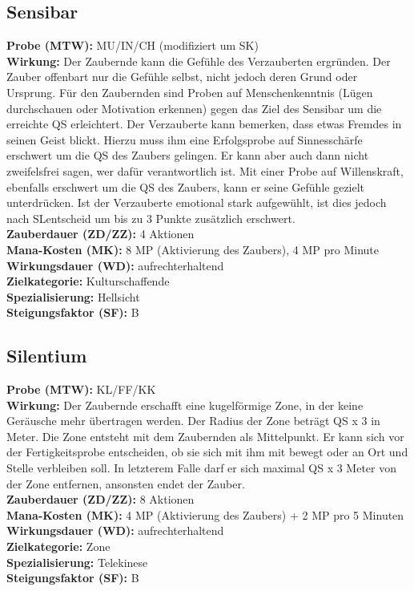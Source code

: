 \subsection{Sensibar}
\label{chap:sensibar}
\textbf{Probe (MTW):} MU/IN/CH (modifiziert um SK) \\
\textbf{Wirkung:} Der Zaubernde kann die Gefühle des Verzauberten ergründen. Der Zauber offenbart nur die Gefühle selbst, nicht jedoch deren Grund oder Ursprung. Für den Zaubernden sind Proben auf Menschenkenntnis (Lügen durchschauen oder Motivation erkennen) gegen das Ziel des Sensibar um die erreichte QS erleichtert. Der Verzauberte kann bemerken, dass etwas Fremdes in seinen Geist blickt. Hierzu muss ihm eine Erfolgsprobe auf Sinnesschärfe erschwert um die QS des Zaubers gelingen. Er kann aber auch dann nicht zweifelsfrei sagen, wer dafür verantwortlich ist. Mit einer Probe auf Willenskraft, ebenfalls erschwert um die QS des Zaubers, kann er seine Gefühle gezielt unterdrücken. Ist der Verzauberte emotional stark aufgewühlt, ist dies jedoch nach SLentscheid um bis zu 3 Punkte zusätzlich erschwert. \\
\textbf{Zauberdauer (ZD/ZZ):} 4 Aktionen \\
\textbf{Mana-Kosten (MK):} 8 MP (Aktivierung des Zaubers), 4 MP pro Minute \\
\textbf{Wirkungsdauer (WD):} aufrechterhaltend \\
\textbf{Zielkategorie:} Kulturschaffende \\
\textbf{Spezialisierung:} Hellsicht \\
\textbf{Steigungsfaktor (SF):} B


\subsection{Silentium}
\label{chap:silentium}
\textbf{Probe (MTW):} KL/FF/KK \\
\textbf{Wirkung:} Der Zaubernde erschafft eine kugelförmige Zone, in der keine Geräusche mehr übertragen werden. Der Radius der Zone beträgt QS x 3 in Meter. Die Zone entsteht mit dem Zaubernden als Mittelpunkt. Er kann sich vor der Fertigkeitsprobe entscheiden, ob sie sich mit ihm mit bewegt oder an Ort und Stelle verbleiben soll. In letzterem Falle darf er sich maximal QS x 3 Meter von der Zone entfernen, ansonsten endet der Zauber. \\
\textbf{Zauberdauer (ZD/ZZ):} 8 Aktionen \\
\textbf{Mana-Kosten (MK):} 4 MP (Aktivierung des Zaubers) + 2 MP pro 5 Minuten \\
\textbf{Wirkungsdauer (WD):} aufrechterhaltend \\
\textbf{Zielkategorie:} Zone \\
\textbf{Spezialisierung:} Telekinese \\
\textbf{Steigungsfaktor (SF):} B


